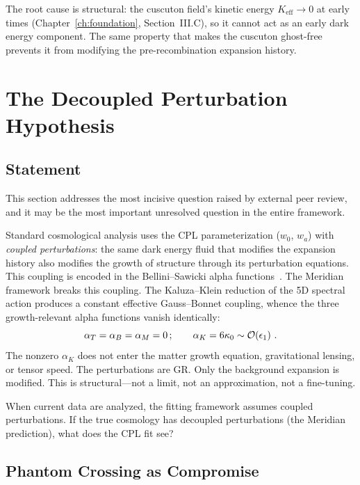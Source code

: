 The root cause is structural: the cuscuton field's kinetic energy $K_\mathrm{eff} \to 0$ at early times (Chapter~\ref{ch:foundation}, Section~III.C), so it cannot act as an early dark energy component. The same property that makes the cuscuton ghost-free prevents it from modifying the pre-recombination expansion history.

\section{The Decoupled Perturbation Hypothesis}
\label{sec:2-decoupled}

\subsection{Statement}
\label{sec:2-decoupled-statement}

This section addresses the most incisive question raised by external peer review, and it may be the most important unresolved question in the entire framework.

Standard cosmological analysis uses the CPL parameterization ($w_0$, $w_a$) with \emph{coupled perturbations}: the same dark energy fluid that modifies the expansion history also modifies the growth of structure through its perturbation equations. This coupling is encoded in the Bellini--Sawicki alpha functions~\cite{ch2:Bellini2014}. The Meridian framework breaks this coupling. The Kaluza--Klein reduction of the 5D spectral action produces a constant effective Gauss--Bonnet coupling, whence the three growth-relevant alpha functions vanish identically:
\begin{equation}
\alpha_T = \alpha_B = \alpha_M = 0\,; \qquad \alpha_K = 6\kappa_0 \sim \mathcal{O}\!\left(\epsilon_1\right)\,.
\label{eq:2-alphas-zero}
\end{equation}
The nonzero $\alpha_K$ does not enter the matter growth equation, gravitational lensing, or tensor speed. The perturbations are GR. Only the background expansion is modified. This is structural---not a limit, not an approximation, not a fine-tuning.

When current data are analyzed, the fitting framework assumes coupled perturbations. If the true cosmology has decoupled perturbations (the Meridian prediction), what does the CPL fit see?

\subsection{Phantom Crossing as Compromise}
\label{sec:2-decoupled-phantom}

